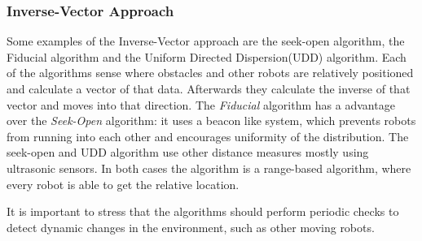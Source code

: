 \subsubsection{Inverse-Vector Approach}
Some examples of the Inverse-Vector approach are the seek-open algorithm\cite{morlok2007dispersing}, the Fiducial algorithm\cite{morlok2007dispersing} and the Uniform Directed Dispersion(UDD) algorithm\cite{mclurkin2007distributed}.
Each of the algorithms sense where obstacles and other robots are relatively positioned and calculate a vector of that data. Afterwards they calculate the inverse of that vector and moves into that direction.
The \emph{Fiducial} algorithm has a advantage over the \emph{Seek-Open} algorithm: it uses a beacon like system, which prevents robots from running into each other and encourages uniformity of the distribution.
The seek-open and UDD algorithm use other distance measures mostly using ultrasonic sensors. In both cases the algorithm is a range-based algorithm, where every robot is able to get the relative location. 

It is important to stress that the algorithms should perform periodic checks to detect dynamic changes in the environment, such as other moving robots.

  \begin{table}[H]
  \renewcommand{\arraystretch}{1.3}
  \label{table_alg_dispersion}
  \centering
{}
  \caption{Overview of Common Dispersion Algorithms}
  \end{table}


